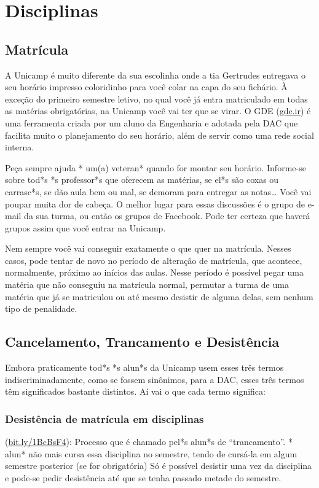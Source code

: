 
\section{Disciplinas}

\subsection{Matrícula}

A Unicamp é muito diferente da sua escolinha onde a tia Gertrudes entregava o
seu horário impresso coloridinho para você colar na capa do seu fichário.  À
exceção do primeiro semestre letivo, no qual você já entra matriculado em todas
as matérias obrigatórias, na Unicamp você vai ter que se virar.  O GDE
(\url{gde.ir}) é uma ferramenta criada por um aluno da Engenharia e adotada pela
DAC que facilita muito o planejamento do seu horário, além de servir como uma
rede social interna.

Peça sempre ajuda * um(a) veteran* quando for montar seu horário. Informe-se
sobre tod*s *s professor*s que oferecem as matérias, se el*s são coxas ou
carrasc*s, se dão aula bem ou mal, se demoram para entregar as notas{\dots} Você
vai poupar muita dor de cabeça. O melhor lugar para essas discussões é o grupo
de e-mail da sua turma, ou então os grupos de Facebook. Pode ter certeza que
haverá grupos assim que você entrar na Unicamp.

Nem sempre você vai conseguir exatamente o que quer na matrícula. Nesses casos,
pode tentar de novo no período de alteração de matrícula, que acontece,
normalmente, próximo ao inícios das aulas. Nesse período é possível pegar uma
matéria que não conseguiu na matrícula normal, permutar a turma de uma matéria
que já se matriculou ou até mesmo desistir de alguma delas, sem nenhum tipo de
penalidade.

\subsection{Cancelamento, Trancamento e Desistência}

Embora praticamente tod*s *s alun*s da Unicamp usem esses três termos
indiscriminadamente, como se fossem sinônimos, para a DAC, esses três termos têm
significados bastante distintos. Aí vai o que cada termo significa:

\subsubsection{Desistência de matrícula em disciplinas} (\url{bit.ly/1BcBsF4}):
Processo que é chamado pel*s alun*s de ``trancamento''.  * alun* não mais cursa
essa disciplina no semestre, tendo de cursá-la em algum semestre posterior (se
for obrigatória) Só é possível desistir uma vez da disciplina e pode-se pedir
desistência até que se tenha passado metade do semestre.
